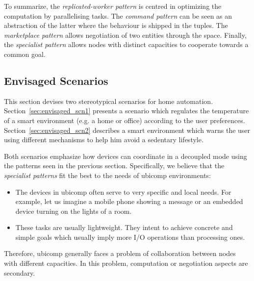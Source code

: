 To summarize, the \emph{replicated-worker pattern} is centred in optimizing the computation by parallelising tasks.
The \emph{command pattern} can be seen as an abstraction of the latter where the behaviour is shipped in the tuples.
The \emph{marketplace pattern} allows negotiation of two entities through the space.
Finally, the \emph{specialist pattern} allows nodes with distinct capacities to cooperate towards a common goal.




\subsection{Envisaged Scenarios}
\label{sec:envisaged_scenarios}

This section devises two stereotypical scenarios for home automation.
Section~\ref{sec:envisaged_scn1} presents a scenario which regulates the temperature of a smart environment (e.g. a home or office) according to the user preferences.
Section~\ref{sec:envisaged_scn2} describes a smart environment which warns the user using different mechanisms to help him avoid a sedentary lifestyle.


Both scenarios emphasize how devices can coordinate in a decoupled mode using the patterns seen in the previous section. %
Specifically, we believe that the \emph{specialist patterns} fit the best to the needs of \ac{ubicomp} environments:
\begin{itemize}
  \item The devices in \ac{ubicomp} often serve to very specific and local needs.
        For example, let us imagine a mobile phone showing a message or an embedded device turning on the lights of a room.
  \item These tasks are usually lightweight. %
        They intent to achieve concrete and simple goals which usually imply more I/O operations than processing ones.
\end{itemize}
Therefore, \ac{ubicomp} generally faces a problem of collaboration between nodes with different capacities.
In this problem, computation or negotiation aspects are secondary. %


